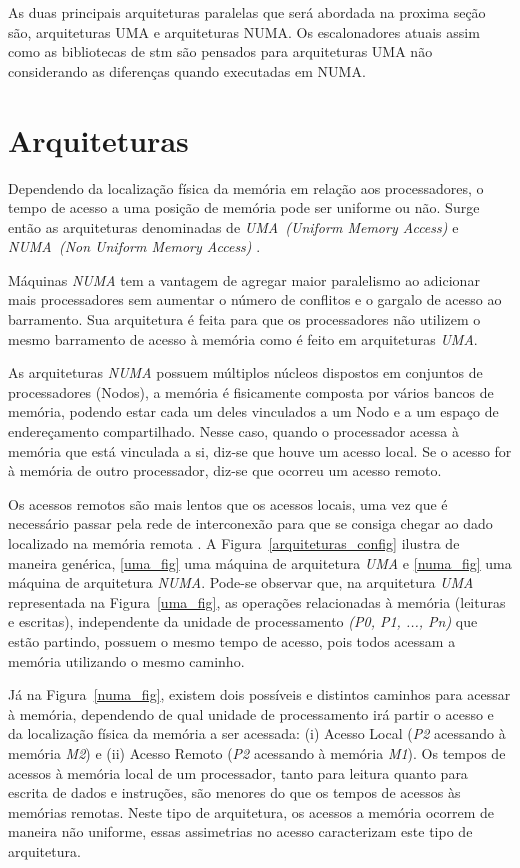 \documentclass[diss,capa]{texufpel}
\begin{document}
As duas principais arquiteturas paralelas que será abordada na proxima seção são, arquiteturas UMA e arquiteturas NUMA. Os escalonadores atuais assim como as bibliotecas de stm são pensados para arquiteturas UMA não considerando as diferenças quando executadas em NUMA.

\section{Arquiteturas}

Dependendo da localização física da memória em relação aos processadores, o tempo de acesso a uma posição de memória pode ser uniforme ou não. Surge então as arquiteturas denominadas de \emph{UMA~(Uniform Memory Access)} e \emph{NUMA~(Non Uniform Memory Access)} \cite{carissimi_2007}.

Máquinas \emph{NUMA} tem a vantagem de agregar maior paralelismo ao adicionar mais processadores sem aumentar o número de conflitos e o gargalo de acesso ao barramento. Sua arquitetura é feita para que os processadores não utilizem o mesmo barramento de acesso à memória como é feito em arquiteturas \emph{UMA}. %

As arquiteturas \emph{NUMA} possuem múltiplos núcleos dispostos em conjuntos de processadores (Nodos), a memória é fisicamente composta por vários bancos de memória, podendo estar cada um deles vinculados a um Nodo e a um espaço de endereçamento compartilhado. Nesse caso, quando o processador acessa à memória que está vinculada a si, diz-se que houve um acesso local. Se o acesso for à memória de outro processador, diz-se que ocorreu um acesso remoto.

Os acessos remotos são mais lentos que os acessos locais, uma vez que é necessário passar pela rede de interconexão para que se consiga chegar ao dado localizado na memória remota \cite{Rodolfo:2014}. A Figura~\ref{arquiteturas_config} ilustra de maneira genérica, \ref{uma_fig} uma máquina de arquitetura \emph{UMA} e \ref{numa_fig} uma máquina de arquitetura \emph{NUMA}. Pode-se observar que, na arquitetura \emph{UMA} representada na Figura~\ref{uma_fig}, as operações relacionadas à memória (leituras e escritas), independente da unidade de processamento \emph{(P0, P1, ..., Pn)} que estão partindo, possuem o mesmo tempo de acesso, pois todos acessam a memória utilizando o mesmo caminho.

Já na Figura~\ref{numa_fig}, existem dois possíveis e distintos caminhos para acessar à memória, dependendo de qual unidade de processamento irá partir o acesso e da localização física da memória a ser acessada: (i) Acesso Local (\emph{P2} acessando à memória \emph{M2}) e (ii) Acesso Remoto (\emph{P2} acessando à memória \emph{M1}). Os tempos de acessos à memória local de um processador, tanto para leitura quanto para escrita de dados e instruções, são menores do que os tempos de acessos às memórias remotas. Neste tipo de arquitetura, os acessos a memória ocorrem de maneira não uniforme, essas assimetrias no acesso caracterizam este tipo de arquitetura.
\end{document}
